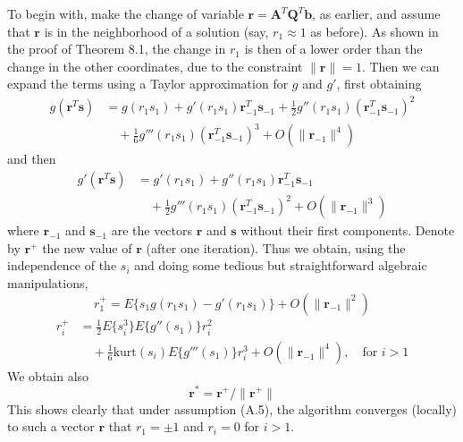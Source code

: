 \documentclass[12pt,a4paper,twoside,openany]{book}
\begin{document}
To begin with, make the change of variable $\mathbf{r} = \mathbf{A}^T \mathbf{Q}^T \mathbf{b}$, as earlier, and assume that $\mathbf{r}$ is in 
the neighborhood of a solution (say, $r_1 \approx 1$ as before). As shown in the proof of Theorem 8.1, the change in $r_1$ is then of a lower order 
than the change in the other coordinates, due to the constraint $\|\mathbf{r}\| = 1$. Then we can expand the terms using a Taylor approximation for $g$ and $g'$, first obtaining
\begin{equation}
\begin{aligned}
    g(\mathbf{r}^T \mathbf{s}) &= g(r_1 s_1) + g'(r_1 s_1)\mathbf{r}_{-1}^T \mathbf{s}_{-1} + \frac{1}{2} g''(r_1 s_1)(\mathbf{r}_{-1}^T \mathbf{s}_{-1})^2 \\
    &\quad + \frac{1}{6} g'''(r_1 s_1)(\mathbf{r}_{-1}^T \mathbf{s}_{-1})^3 + O(\|\mathbf{r}_{-1}\|^4)
\end{aligned}
\end{equation}
and then
\begin{equation}
\begin{aligned}
    g'(\mathbf{r}^T \mathbf{s}) &= g'(r_1 s_1) + g''(r_1 s_1)\mathbf{r}_{-1}^T \mathbf{s}_{-1} \\
    &\quad + \frac{1}{2} g'''(r_1 s_1)(\mathbf{r}_{-1}^T \mathbf{s}_{-1})^2 + O(\|\mathbf{r}_{-1}\|^3)
\end{aligned}
\end{equation}
where $\mathbf{r}_{-1}$ and $\mathbf{s}_{-1}$ are the vectors $\mathbf{r}$ and $\mathbf{s}$ without their first components. Denote by $\mathbf{r}^+$ 
the new value of $\mathbf{r}$ (after one iteration). Thus we obtain, using the independence of the $s_i$ and doing some tedious but straightforward algebraic manipulations,
\begin{equation}
    r_1^+ = E\{s_1 g(r_1 s_1) - g'(r_1 s_1)\} + O(\|\mathbf{r}_{-1}\|^2)
\end{equation}
\begin{equation}
\begin{aligned}
    r_i^+ &= \frac{1}{2} E\{s_i^3\} E\{g''(s_1)\} r_i^2 \\
    &\quad + \frac{1}{6} \text{kurt}(s_i) E\{g'''(s_1)\} r_i^3 + O(\|\mathbf{r}_{-1}\|^4), \quad \text{for } i > 1
\end{aligned}
\end{equation}
We obtain also
\begin{equation}
    \mathbf{r}^* = \mathbf{r}^+ / \|\mathbf{r}^+\|
\end{equation}
This shows clearly that under assumption (A.5), the algorithm converges (locally) to such a vector $\mathbf{r}$ that $r_1 = \pm 1$ and $r_i = 0$ for $i > 1$. 
\end{document}
